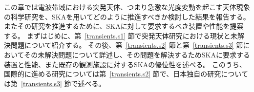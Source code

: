 { %
\renewcommand{\floatpagefraction}{0.7}
\newcommand{\skasur}[1]{SKA#1-SUR} %
\newcommand{\skamid}[1]{SKA#1-MID}
\newcommand{\skalow}[1]{SKA#1-LOW}
\newcommand{\skalowmidsur}[1]{SKA#1-LOW/MID/SUR}
\newcommand{\skamidsur}[1]{SKA#1-MID/SUR}
\newcommand{\Eqref}[1]{式~(\ref{#1})}
\newcommand{\Tabref}[1]{表~\ref{#1}}
\newcommand{\Figref}[1]{図~\ref{#1}}
\newcommand{\Chapref}[1]{第~\ref{#1} 章}
\newcommand{\Secref}[1]{第~\ref{#1} 節}
\newcommand{\im}{\text{i}\mspace{+1mu}} %
\newcommand{\e}{\text{e}}               %
\newcommand{\td}{\text{d}}              %
\newcommand{\uph}{\mbox{$^\text{h}$}}   %
\newcommand{\upm}{\mbox{$^\text{m}$}}   %
\newcommand{\ups}{\mbox{$^\text{s}$}}   %
\newcommand{\arcdeg}{\mbox{$^\circ$}}   %
\newcommand{\arcmin}{\mbox{$'$}}        %
\newcommand{\sqdeg}{\text{deg}^{2}}     %
\newcommand{\persqdeg}{\text{deg}^{-2}} %
\newcommand{\persky}{\text{sky}^{-1}}   %
\newcommand{\peryr}{\text{year}^{-1}}   %
\newcommand{\perday}{\text{day}^{-1}}   %
\newenvironment{tablenotes}{\begin{center}\begin{minipage}{0.8\hsize}\small 注---}{\end{minipage}\end{center}} %
\newenvironment{tablecomments}[1]{\begin{center}\begin{minipage}{0.8\hsize}\small $^{#1}$~}{\end{minipage}\end{center}} %


この章では電波帯域における突発天体、つまり急激な光度変動を起こす天体現象の科学研究を、SKAを用いてどのように推進すべきか検討した結果を報告する。
またその研究を推進するために、SKAに対して要求するべき装置や性能を提案する。
まずはじめに、\Secref{transients.s1}で突発天体研究における現状と未解決問題について紹介する。
その後、\Secref{transients.s2}と\Secref{transients.s3}においてその未解決問題について詳述し、その問題を解決するためSKAに要求する装置と性能、また既存の観測施設に対するSKAの優位性を述べる。
このうち、国際的に進める研究については\Secref{transients.s2}で、日本独自の研究については\Secref{transients.s3}で述べる。








} %
